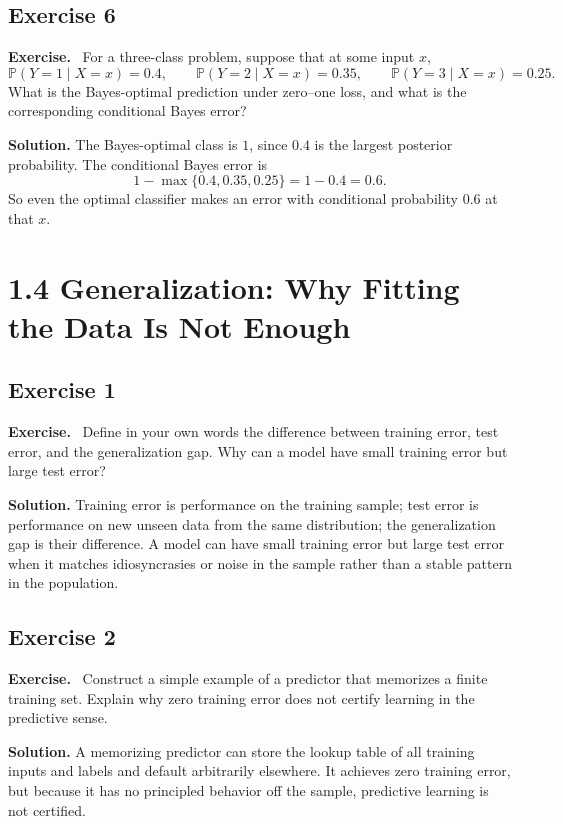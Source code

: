 \documentclass[11pt]{article}
\newenvironment{exercisebox}{\begin{framed}\noindent\textbf{Exercise.}\ }{\end{framed}}
\begin{document}
\subsection*{Exercise 6}
\begin{exercisebox}
For a three-class problem, suppose that at some input $x$,
\[
\mathbb P(Y=1\mid X=x)=0.4,\qquad
\mathbb P(Y=2\mid X=x)=0.35,\qquad
\mathbb P(Y=3\mid X=x)=0.25.
\]
What is the Bayes-optimal prediction under zero--one loss, and what is the corresponding conditional Bayes error?
\end{exercisebox}
\textbf{Solution.} The Bayes-optimal class is $1$, since $0.4$ is the largest posterior probability. The conditional Bayes error is
\[
1-\max\{0.4,0.35,0.25\}=1-0.4=0.6.
\]
So even the optimal classifier makes an error with conditional probability $0.6$ at that $x$.

\section{1.4 Generalization: Why Fitting the Data Is Not Enough}
\subsection*{Exercise 1}
\begin{exercisebox}
Define in your own words the difference between training error, test error, and the generalization gap. Why can a model have small training error but large test error?
\end{exercisebox}
\textbf{Solution.} Training error is performance on the training sample; test error is performance on new unseen data from the same distribution; the generalization gap is their difference. A model can have small training error but large test error when it matches idiosyncrasies or noise in the sample rather than a stable pattern in the population.

\subsection*{Exercise 2}
\begin{exercisebox}
Construct a simple example of a predictor that memorizes a finite training set. Explain why zero training error does not certify learning in the predictive sense.
\end{exercisebox}
\textbf{Solution.} A memorizing predictor can store the lookup table of all training inputs and labels and default arbitrarily elsewhere. It achieves zero training error, but because it has no principled behavior off the sample, predictive learning is not certified.
\end{document}
